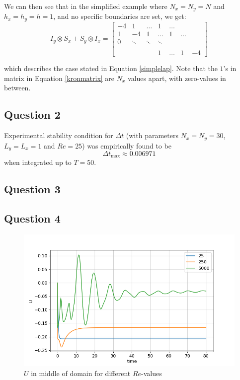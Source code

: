 \documentclass[10pt]{report}
\begin{document}
We can then see that in the simplified example where $N_x = N_y = N$ and $h_x = h_y = h = 1$, and no specific boundaries are set, we get:
\begin{equation}
    I_y \otimes S_x + S_y \otimes I_x = \begin{bmatrix}
        -4&1&\hdots&1&\hdots\\
        1&-4&1&\hdots&1&\hdots\\
        0 &\ddots&\ddots &\ddots \\\\
        &&&1&\hdots&1&-4
    \end{bmatrix} \label{kronmatrix}
\end{equation}

which describes the case stated in Equation \ref{simplelap}. Note that the $1$'s in matrix in Equation \ref{kronmatrix} are $N_x$ 
values apart, with zero-values in between.
\subsection*{Question 2}
Experimental stability condition for $\Delta t$ 
(with parameters $N_x = N_y = 30$, $L_y = L_x = 1$ and $Re = 25$) was empirically found to be
\[
\Delta t_{\text{max}} \approx 0.006971
\]
when integrated up to $T = 50$.

\subsection*{Question 3}
\subsection*{Question 4}
\begin{figure}[H]
    \centering
    \includegraphics[width = \textwidth]{figures/plot1.png}
    \caption{$U$ in middle of domain for different $Re$-values}
    \label{plot1}
\end{figure}
\end{document}
